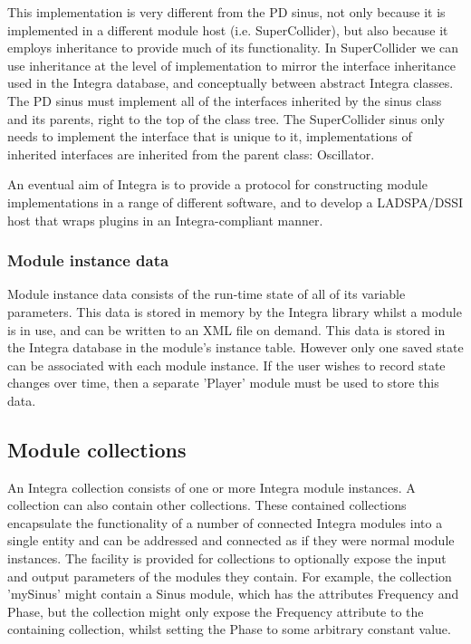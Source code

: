 This implementation is very different from the PD sinus, not only
because it is implemented in a different module host (i.e.
SuperCollider), but also because it employs inheritance to provide
much of its functionality. In SuperCollider we can use inheritance at
the level of implementation to mirror the interface inheritance used
in the Integra database, and conceptually between abstract Integra
classes. The PD sinus must implement all of the interfaces inherited
by the sinus class and its parents, right to the top of the class
tree. The SuperCollider sinus only needs to implement the interface
that is unique to it, implementations of inherited interfaces are
inherited from the parent class: Oscillator.

An eventual aim of Integra is to provide a protocol for constructing
module implementations in a range of different software, and to
develop a LADSPA/DSSI host that wraps plugins in an Integra-compliant
manner.

\subsubsection{Module instance data}\label{subsubsec:module_instance_data}

Module instance data consists of the run-time state of all of its
variable parameters. This data is stored in memory by the Integra
library whilst a module is in use, and can be written to an XML file
on demand. This data is stored in the Integra database in the module's
instance table. However only one saved state can be associated with
each module instance. If the user wishes to record state changes over
time, then a separate 'Player' module must be used to store this data.

\subsection{Module collections}\label{subsec:module_collections}

An Integra collection consists of one or more Integra module
instances. A collection can also contain other collections. These
contained collections encapsulate the functionality of a number of
connected Integra modules into a single entity and can be addressed
and connected as if they were normal module instances. The facility is
provided for collections to optionally expose the input and output
parameters of the modules they contain. For example, the collection
'mySinus' might contain a Sinus module, which has the attributes
Frequency and Phase, but the collection might only expose the
Frequency attribute to the containing collection, whilst setting the
Phase to some arbitrary constant value.

